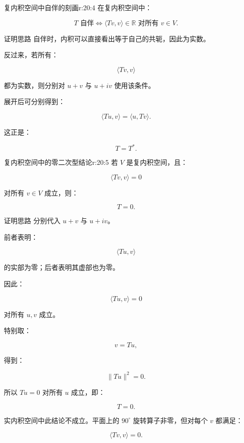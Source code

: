 \begin{jprop}{复内积空间中自伴的刻画}{r:20:4}
在复内积空间中：

\[
T\text{ 自伴}
\iff
\langle Tv,v\rangle\in\mathbb R
\text{ 对所有 }v\in V.
\]
\end{jprop}

\begin{jproof}{证明思路}
自伴时，内积可以直接看出等于自己的共轭，因此为实数。

反过来，若所有：

\[
\langle Tv,v\rangle
\]

都为实数，则分别对 $u+v$ 与 $u+iv$ 使用该条件。

展开后可分别得到：

\[
\langle Tu,v\rangle
=
\langle u,Tv\rangle.
\]

这正是：

\[
T=T^*.
\]
\end{jproof}

\begin{jprop}{复内积空间中的零二次型结论}{r:20:5}
若 $V$ 是复内积空间，且：

\[
\langle Tv,v\rangle=0
\]

对所有 $v\in V$ 成立，则：

\[
T=0.
\]
\end{jprop}

\begin{jproof}{证明思路}
分别代入 $u+v$ 与 $u+iv$。

前者表明：

\[
\langle Tu,v\rangle
\]

的实部为零；后者表明其虚部也为零。

因此：

\[
\langle Tu,v\rangle=0
\]

对所有 $u,v$ 成立。

特别取：

\[
v=Tu,
\]

得到：

\[
\|Tu\|^2=0.
\]

所以 $Tu=0$ 对所有 $u$ 成立，即：

\[
T=0.
\]

实内积空间中此结论不成立。平面上的 $90^\circ$ 旋转算子非零，但对每个 $v$ 都满足：

\[
\langle Tv,v\rangle=0.
\]
\end{jproof}
